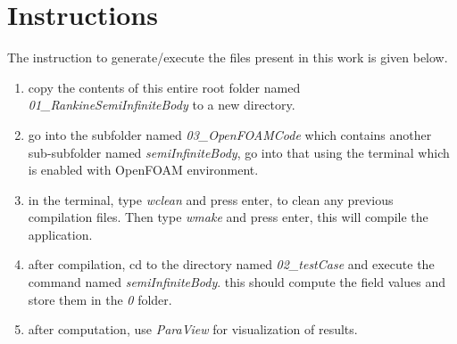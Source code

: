 \documentclass[12pt]{article}
\begin{document}
\section{Instructions}
The instruction to generate/execute the files present in this work is given below.

\begin{enumerate}
	\item copy the contents of this entire root folder named \emph{01\_RankineSemiInfiniteBody} to a new directory.
	\item go into the subfolder named \emph{03\_OpenFOAMCode} which contains another sub-subfolder named \emph{semiInfiniteBody}, go into that using the terminal which is enabled with OpenFOAM environment.
	\item in the terminal, type \emph{wclean} and press enter, to clean any previous compilation files. Then type \emph{wmake} and press enter, this will compile the application.
	\item after compilation, cd to the directory named \emph{02\_testCase} and execute the command named \emph{semiInfiniteBody}. this should compute the field values and store them in the \emph{0} folder.
	\item after computation, use \emph{ParaView} for visualization of results.
\end{enumerate}
\end{document}
